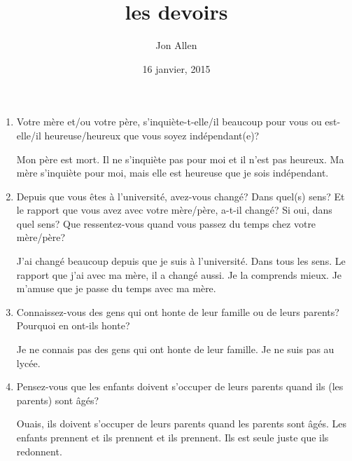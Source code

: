 \documentclass[letterpaper]{article}
\begin{document}
\title{les devoirs}
\date{16 janvier, 2015}
\author{Jon Allen}
\maketitle
\begin{enumerate}
\item
\singlespacing
Votre mère et/ou votre père, s'inquiète-t-elle/il beaucoup pour vous ou est-elle/il heureuse/heureux que vous soyez indépendant(e)?

\doublespacing
Mon père est mort. Il ne s'inquiète pas pour moi et il n'est pas heureux. Ma mère s'inquiète pour moi, mais elle est heureuse que je sois indépendant.
\item
\singlespacing
Depuis que vous êtes à l'université, avez-vous changé?  Dans quel(s) sens?  Et le rapport que vous avez avec votre mère/père, a-t-il changé?  Si oui, dans quel sens?  Que ressentez-vous quand vous passez du temps chez votre mère/père?

\doublespacing
J'ai changé beaucoup depuis que je suis à l'université. Dans tous les sens. Le rapport que j'ai avec ma mère, il a changé aussi. Je la comprends mieux. Je m'amuse que je passe du temps avec ma mère.

\item
\singlespacing
Connaissez-vous des gens qui ont honte de leur famille ou de leurs parents?  Pourquoi en ont-ils honte?

\doublespacing
Je ne connais pas des gens qui ont honte de leur famille. Je ne suis pas au lycée.
\item
\singlespacing
Pensez-vous que les enfants doivent s'occuper de leurs parents quand ils (les parents) sont âgés?

\doublespacing
Ouais, ils doivent s'occuper de leurs parents quand les parents sont âgés. Les enfants prennent et ils prennent et ils prennent. Ils est seule juste que ils redonnent.
\end{enumerate}
\end{document}
